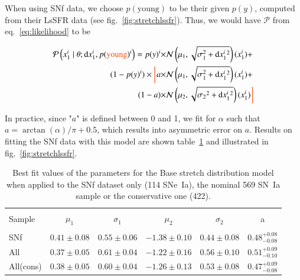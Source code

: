 \documentclass[]{aa} %
\newcommand{\mr}[1]{{\textcolor[rgb]{0.60,0.10,0.6}{#1}}}
\newcommand{\nn}[1]{{\textcolor[rgb]{1, 0.27, 0}{#1}}}
\newcommand{\prob}[2]{\mathcal{P}\left( #1 \mid #2\right)}
\begin{document}
\nn{When using SNf data, we choose $p(\text{young})$ to be their given $p(y)$,
computed from their LsSFR data (see fig.~\ref{fig:stretchlssfr}). Thus, we would
have $\mathcal{P}$ from eq.~\ref{eq:likelihood} to be}

\begin{align}
    \label{eq:likelihoodsnf}
    \prob{x^{i}_{1}}{\theta; \mathrm{d}x^{i}_{1}, p(\nn{\text{young}})^{i}} =
    p(y)^{i} \times &\mathcal{N}\left(\mu_1,
    \sqrt{\sigma_{1}^{2}+\mathrm{d}x^{i}_{1}{}^{2}}\right)(x^{i}_{1}) +
    \nonumber\\
    (1-p(y)^{i}) \times \nn{\bigg[} a \times & \mathcal{N}\left(\mu_1,
        \sqrt{\sigma_{1}^{2}+\mathrm{d}x^{i}_{1}{}^{2}}\right)(x^{i}_{1}) +
        \nonumber\\
     (1-a) \times &\mathcal{N}\left(\mu_2,
 \sqrt{\sigma_2{}^{2}+\mathrm{d}x^{i}_{1}{}^{2}}\right)(x^{i}_{1}) \nn{\bigg]}
\end{align}

In practice, since "$a$" is defined between 0 and 1, we fit for $\alpha$ such
that $a=\arctan(\alpha)/\pi+0.5$, which results into asymmetric error on $a$.
\mr{Results on fitting the SNf data with this model are shown
table~\ref{tab:modelresults} and illustrated in fig.~\ref{fig:stretchlssfr}.}

\begin{table}
    \centering
    \caption{Best fit values of the parameters for the Base stretch distribution
    model when applied to the SNf dataset only (114 SNe~Ia), the nominal 569
SN~Ia sample or the conservative one (422).}
    \label{tab:modelresults}
    \begin{tabular}{l c c c c c}
    \hline\hline\\[-0.8em]
        Sample & $\mu_1$  & $\sigma_1$ &$\mu_2$  & $\sigma_2$ & a \\[0.15em]
        \hline\\[-0.8em]
        SNf & $0.41 \pm 0.08$  & $0.55 \pm 0.06$ & $-1.38 \pm 0.10$ & $0.44 \pm 0.08$ & $0.48^{+0.08}_{-0.08}$ \\[0.15em]
        All & $0.37 \pm 0.05$  & $0.61 \pm 0.04$ & $-1.22 \pm 0.16$ & $0.56 \pm 0.10$ & $0.51^{+0.09}_{-0.10}$ \\[0.15em]
        All(cons) & $0.38 \pm 0.05$  & $0.60 \pm 0.04$ & $-1.26 \pm 0.13$ & $0.53 \pm 0.08$ & $0.47^{+0.09}_{-0.08}$ \\[0.15em]
        \hline
    \end{tabular}
\end{table}
\end{document}
